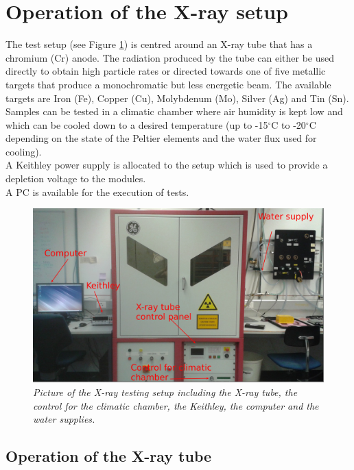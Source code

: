 \documentclass[a4paper,12pt,twoside]{article}
\begin{document}
\section{Operation of the X-ray setup}  \label{Xraysetup}
The test setup (see Figure \ref{Setup}) is centred around an X-ray tube that has a chromium (Cr) anode. The radiation produced by the tube can either be used directly to obtain high particle rates or directed towards one of five metallic targets that produce a monochromatic but less energetic beam. The available targets are Iron (Fe), Copper (Cu), Molybdenum (Mo), Silver (Ag) and Tin (Sn). \\
Samples can be tested in a climatic chamber where air humidity is kept low and which can be cooled down to a desired temperature (up to -15$^\circ$C to -20$^\circ$C depending on the state of the Peltier elements and the water flux used for cooling). \\
A Keithley power supply is allocated to the setup which is used to provide a depletion voltage to the modules. \\
A PC is available for the execution of tests.

\begin{figure} [h!] \centering
\includegraphics[width=\textwidth, angle=0] {./Setup.jpg}
\caption{\em  \label{Setup}
Picture of the X-ray testing setup including the X-ray tube, the control for the climatic chamber, the Keithley, the computer and the water supplies.}
\end{figure}


\subsection{Operation of the X-ray tube} \label{Operation}
\end{document}
